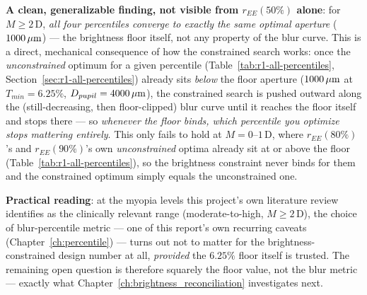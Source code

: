 \textbf{A clean, generalizable finding, not visible from $r_{EE}(50\%)$ alone}: for
$M\ge2\,$D, \emph{all four percentiles converge to exactly the same optimal aperture}
($1000\,\mu\text{m}$) --- the brightness floor itself, not any property of the blur curve. This
is a direct, mechanical consequence of how the constrained search works: once the
\emph{unconstrained} optimum for a given percentile (Table~\ref{tab:r1-all-percentiles},
Section~\ref{sec:r1-all-percentiles}) already sits \emph{below} the floor aperture
($1000\,\mu\text{m}$ at $T_{min}=6.25\%$, $D_{pupil}=4000\,\mu\text{m}$), the constrained search is pushed
outward along the (still-decreasing, then floor-clipped) blur curve until it reaches
the floor itself and stops there --- so \emph{whenever the floor binds, which
percentile you optimize stops mattering entirely}. This only fails to hold at
$M=0$--$1\,$D, where $r_{EE}(80\%)$'s and $r_{EE}(90\%)$'s own \emph{unconstrained}
optima already sit at or above the floor (Table~\ref{tab:r1-all-percentiles}), so the
brightness constraint never binds for them and the constrained optimum simply equals
the unconstrained one.

\textbf{Practical reading}: at the myopia levels this project's own literature review
identifies as the clinically relevant range (moderate-to-high, $M\ge2\,$D), the choice
of blur-percentile metric --- one of this report's own recurring caveats
(Chapter~\ref{ch:percentile}) --- turns out not to matter for the brightness-constrained
design number at all, \emph{provided} the $6.25\%$ floor itself is trusted. The
remaining open question is therefore squarely the floor value, not the blur metric ---
exactly what Chapter~\ref{ch:brightness_reconciliation} investigates next.
